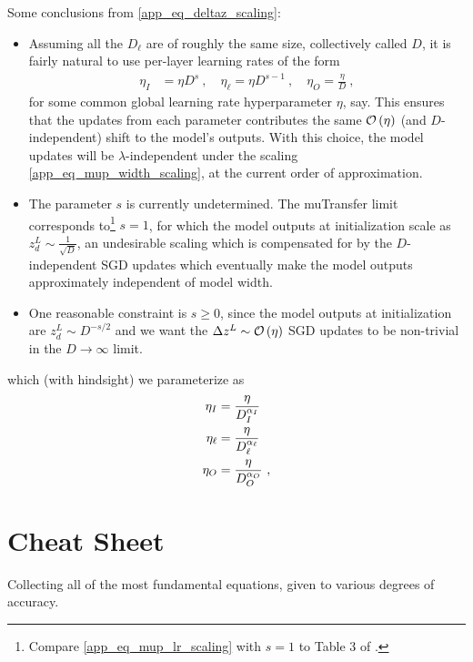 Some conclusions from \eqref{app_eq_deltaz_scaling}:
\begin{itemize}
    \item Assuming all the $ D_{ \ell } $ are of roughly the same size, collectively called $ D $,
        it is fairly natural to use per-layer learning rates of the form
        \begin{align}
            \eta_{ I } &= \eta  D^{ s }\ ,\quad
            \eta_{ \ell } = \eta D^{ s-1 }\ , \quad
            \eta_{ O } =\frac{ \eta }{ D } \ , \label{app_eq_mup_lr_scaling}
        \end{align}
        for some common global learning rate hyperparameter $ \eta $, say. This ensures that the updates from
        each parameter contributes the same $ \mathcal{O} \left( \eta \right)  $ (and $ D $-independent)
        shift to the model's outputs. With this choice, the model updates will be $ \lambda
        $-independent under the scaling \eqref{app_eq_mup_width_scaling}, at the current order of
        approximation.
    \item The parameter $ s $ is currently undetermined. The muTransfer limit \cite{yang2022tensor}
        corresponds to\footnote{Compare \eqref{app_eq_mup_lr_scaling} with $ s=1 $ to Table 3 of
        \cite{yang2022tensor}.} $ s=1 $, for which the model outputs at initialization scale as $
        z^{ L }_{ d }\sim \frac{ 1 }{ \sqrt{D} }  $, an undesirable scaling which is compensated for
        by the $ D $-independent SGD updates which eventually make the model outputs approximately
        independent of model width.
    \item One reasonable constraint is $ s \ge 0 $, since the model outputs at initialization are $
        z^{ L }_{ d }\sim D^{-s/2 }  $ and we want the $ \Delta z^{ L }\sim \mathcal{O} \left( \eta
        \right)  $ SGD updates to be non-trivial in the $ D\longrightarrow \infty $ limit.
\end{itemize}







which (with hindsight) we parameterize as
\begin{align}
    \eta_{ I } &= \frac{ \eta }{ D_{ I }^{ \alpha _{ I } } }\nonumber\\
    \eta_{ \ell } &= \frac{ \eta }{ D_{ \ell }^{ \alpha _{ \ell } } }\nonumber\\
    \eta_{ O } &= \frac{ \eta }{ D_{ O }^{ \alpha _{ O } } }\ ,
\end{align}


\section{Cheat Sheet \label{app_cheat_sheet}}
Collecting all of the most fundamental equations, given to various degrees of accuracy.

